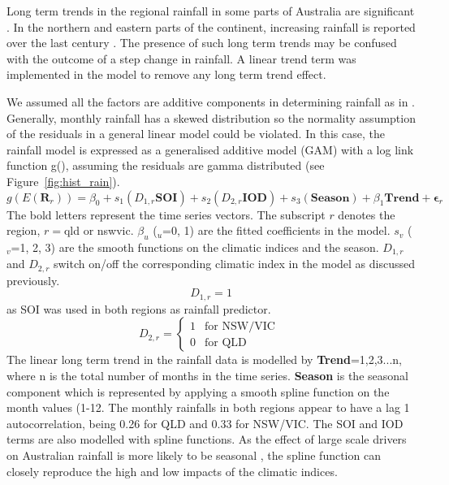 \documentclass[draft,linenumbers]{agujournal}
\begin{document}
\begin{article}
Long term trends in the regional rainfall in some parts of Australia are significant \citep{Hughes2003,Gallant2007,Chowdhury2010}. In the northern and eastern parts of the continent, increasing rainfall is reported over the last century \citep{Hughes2003}. The presence of such long term trends may be confused with the outcome of a step change in rainfall. A linear trend term was implemented in the model to remove any long term trend effect. 

We assumed all the factors are additive components in determining rainfall as in \citet{Kamruzzaman2011}. Generally, monthly rainfall has a skewed distribution so the normality assumption of the residuals in a general linear model could be violated. In this case, the rainfall model is expressed as a generalised additive model (GAM) \citep{Hastie1986} with a log link function g(), assuming the residuals are gamma distributed (see Figure~\ref{fig:hist_rain}).
\vspace{0.5cm}
\begin{equation}
g(E(\mathbf{R}_r)) = \beta_0 + s_1(D_{1,r}\mathbf{SOI}) + s_2(D_{2,r}\mathbf{IOD}) + s_3(\mathbf{Season}) + \beta_1\mathbf{Trend} + \boldsymbol{\epsilon}_r
  \label{eqn:model}
\end{equation}
The bold letters represent the time series vectors. The subscript $r$ denotes the region, $r=$qld or nswvic. $\beta_u$ ($_u$=0, 1) are the fitted coefficients in the model. $s_v$ ($_v$=1, 2, 3) are the smooth functions on the climatic indices and the season. $D_{1,r}$ and $D_{2,r}$ switch on/off the corresponding climatic index in the model as discussed previously. 
\begin{equation}
  D_{1,r} = 1 
\end{equation}
as SOI was used in both regions as rainfall predictor.
\begin{equation}
  D_{2,r} = \left\{ \begin{array}{ll}
   1 &\mbox{for NSW/VIC } \\
   0 &\mbox{for QLD}
  \end{array} \right.
  \label{eqn:dummyD}
\end{equation}
The linear long term trend in the rainfall data is modelled by \textbf{Trend}=1,2,3...n, where n is the total number of months in the time series. \textbf{Season} is the seasonal component which is represented by applying a smooth spline function on the month values (1-12. The monthly rainfalls in both regions appear to have a lag 1 autocorrelation, being 0.26 for QLD and 0.33 for NSW/VIC. 
The SOI and IOD terms are also modelled with spline functions. As the effect of large scale drivers on Australian rainfall is more likely to be seasonal \citep{Murphy2008,Schepen2012}, the spline function can closely reproduce the high and low impacts of the climatic indices.


\end{article}
\end{document}
